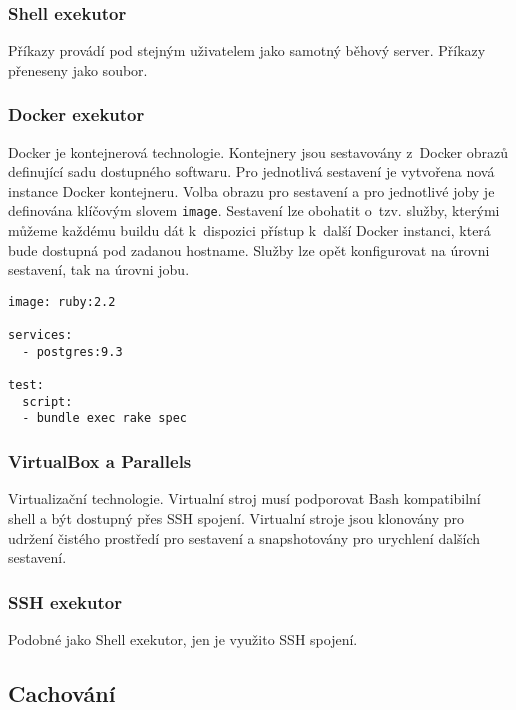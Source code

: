 \subsubsection{Shell exekutor}

Příkazy provádí pod stejným uživatelem jako samotný běhový server.
Příkazy přeneseny jako soubor.

\subsubsection{Docker exekutor}

Docker je kontejnerová technologie.
Kontejnery jsou sestavovány z~Docker obrazů definující sadu dostupného softwaru.
Pro jednotlivá sestavení je vytvořena nová instance Docker kontejneru.
Volba obrazu pro sestavení a pro jednotlivé joby je definována klíčovým slovem \verb|image|.
Sestavení lze obohatit o~tzv. služby, kterými můžeme každému buildu dát k~dispozici přístup k~další Docker instanci, která bude dostupná pod zadanou hostname.
Služby lze opět konfigurovat na úrovni sestavení, tak na úrovni jobu.

\begin{verbatim}
image: ruby:2.2

services:
  - postgres:9.3

test:
  script:
  - bundle exec rake spec
\end{verbatim}

\subsubsection{VirtualBox a Parallels}

Virtualizační technologie.
Virtualní stroj musí podporovat Bash kompatibilní shell a být dostupný přes SSH spojení.
Virtualní stroje jsou klonovány pro udržení čistého prostředí pro sestavení a snapshotovány pro urychlení dalších sestavení.


\subsubsection{SSH exekutor}

Podobné jako Shell exekutor, jen je využito SSH spojení.

\subsection{Cachování}

